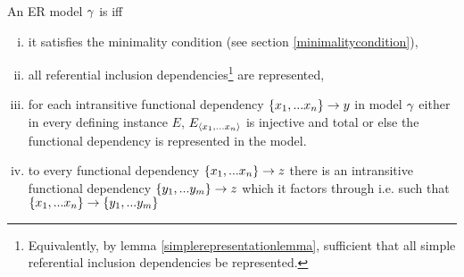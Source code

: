 \begin{definition}
\noindent An ER model $\gamma$ is  
 iff 
\begin{enumerate} [(i)]
\item{
it satisfies the minimality condition (see section \ref{minimalitycondition}),
}
\item{ 
all referential inclusion dependencies\footnote{Equivalently, by lemma
\ref{simplerepresentationlemma}, sufficient that all simple referential inclusion dependencies be represented.} are  represented,
}
\item{
for each intransitive functional dependency $\left\{x_1,...x_n\right\} \rightarrow y$ in model $\gamma$
either in every defining instance $E$, $E_{\langle x_1,...x_n\rangle}$ is injective and total
or else the functional dependency is represented in the model.
}
\item{to every functional dependency $\left\{x_1,...x_n\right\} \rightarrow z$ there is an intransitive functional dependency 
$\left\{y_1,...y_m\right\} \rightarrow z$ which it factors through
i.e. such that $\left\{x_1,...x_n\right\} \rightarrow \left\{y_1,...y_m\right\}$
}
\end{enumerate}
\end{definition}


